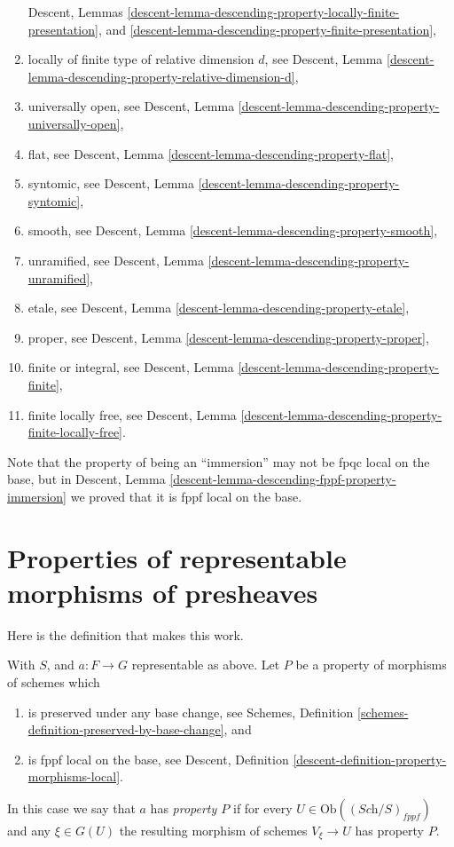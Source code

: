 \begin{remark}
\begin{enumerate}
Descent, Lemmas
\ref{descent-lemma-descending-property-locally-finite-presentation}, and
\ref{descent-lemma-descending-property-finite-presentation},
\item locally of finite type of relative dimension $d$, see
Descent,
Lemma \ref{descent-lemma-descending-property-relative-dimension-d},
\item universally open, see
Descent, Lemma \ref{descent-lemma-descending-property-universally-open},
\item flat, see
Descent, Lemma \ref{descent-lemma-descending-property-flat},
\item syntomic, see
Descent, Lemma \ref{descent-lemma-descending-property-syntomic},
\item smooth, see
Descent, Lemma \ref{descent-lemma-descending-property-smooth},
\item unramified, see
Descent, Lemma \ref{descent-lemma-descending-property-unramified},
\item etale, see
Descent, Lemma \ref{descent-lemma-descending-property-etale},
\item proper, see
Descent, Lemma \ref{descent-lemma-descending-property-proper},
\item finite or integral, see
Descent, Lemma \ref{descent-lemma-descending-property-finite},
\item finite locally free, see
Descent,
Lemma \ref{descent-lemma-descending-property-finite-locally-free}.
\end{enumerate}
Note that the property of being an ``immersion'' may not be fpqc local
on the base, but in
Descent, Lemma \ref{descent-lemma-descending-fppf-property-immersion}
we proved that it is fppf local on the base.
\end{remark}








\section{Properties of representable morphisms of presheaves}
\label{section-representable-properties}

\noindent
Here is the definition that makes this work.

\begin{definition}
\label{definition-relative-representable-property}
With $S$, and $a : F \to G$ representable as above.
Let $P$ be a property of morphisms of schemes which
\begin{enumerate}
\item is preserved under any base change,
see Schemes, Definition \ref{schemes-definition-preserved-by-base-change},
and
\item is fppf local on the base, see
Descent, Definition \ref{descent-definition-property-morphisms-local}.
\end{enumerate}
In this case we say that $a$ has {\it property $P$} if for every
$U \in \text{Ob}((\textit{Sch}/S)_{fppf})$ and
any $\xi \in G(U)$ the resulting morphism of schemes
$V_\xi \to U$ has property $P$.
\end{definition}

